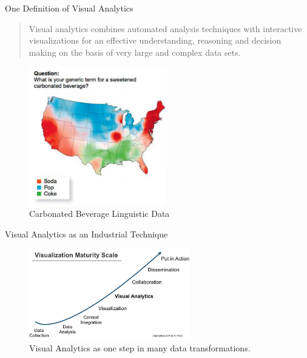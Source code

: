 \documentclass[handout]{beamer}
\begin{document}
\begin{frame}{One Definition of Visual Analytics}
\begin{quote}
Visual analytics combines automated analysis techniques with interactive
visualizations for an effective understanding, reasoning and decision making on
the basis of very large and complex data sets.
\end{quote}
\citep{keim2008visual}
\end{frame}


\begin{frame}
\begin{figure}
  \begin{center}
  \includegraphics[width=6cm]{images/popSoda.jpg}
  \caption{Carbonated Beverage Linguistic Data}
  \label{fig:popsoda}
  \end{center}  
\end{figure}
\end{frame}

\begin{frame}{Visual Analytics as an Industrial Technique}
\begin{figure}
\begin{center}
 \includegraphics[width=7cm]{images/visMaturity.jpg}
  \caption{Visual Analytics as one step in many data transformations.}
  \label{fig:va}
\end{center}
\end{figure}
\citep{marty2012steps}
\end{frame}
\end{document}
